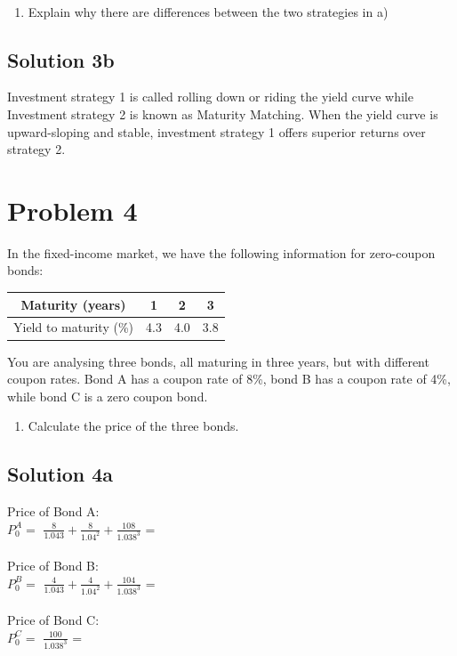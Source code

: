 \documentclass[12]{article}
\begin{document}
\noindent
\\
\color{black}
\begin{enumerate}
    \item[b)] Explain why there are differences between the two strategies in a)   
\end{enumerate}


\color{blue}
\subsection*{Solution 3b}
Investment strategy 1 is called rolling down or riding the yield curve while Investment strategy 2 is known as Maturity Matching. When the yield curve is upward-sloping and stable, investment strategy 1 offers superior returns over strategy 2.





\color{black}
\section*{Problem 4}
In the fixed-income market, we have the following information for zero-coupon bonds:

\begin{table}[H]
    \centering
    \begin{tabular}{cccc}
        Maturity (years) & 1 & 2 & 3\\\midrule
        Yield to maturity (\%) & 4.3 & 4.0 & 3.8\\
    \end{tabular}
    \label{tab:my_label}
\end{table}

\noindent
You are analysing three bonds, all maturing in three years, but with different coupon rates. Bond A has a coupon rate of 8\%, bond B has a coupon rate of 4\%, while bond C is a zero coupon bond.

\begin{enumerate}
    \item [a)] Calculate the price of the three bonds.
\end{enumerate}

\color{blue}
\subsection*{Solution 4a}
Price of Bond A:\\
$P_0^A =$ {\Large $\frac{8}{1.043} + \frac{8}{1.04^2} + \frac{108}{1.038^3}$} = \\
\\
Price of Bond B:\\
$P_0^B =$ {\Large $\frac{4}{1.043} + \frac{4}{1.04^2} + \frac{104}{1.038^3}$} = \\
\\
Price of Bond C:\\
$P_0^C =$ {\Large $\frac{100}{1.038^3}$} = \\
\\
\end{document}
